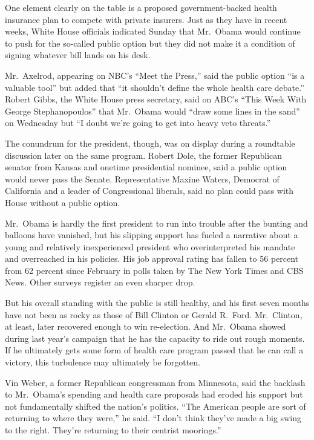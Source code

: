 ﻿\documentclass[12pt]{article}
\begin{document}
One element clearly on the table is a proposed government-backed health insurance plan to compete
with private insurers. Just as they have in recent weeks, White House officials indicated Sunday
that Mr.~Obama would continue to push for the so-called public option but they did not make it a
condition of signing whatever bill lands on his desk.

Mr.~Axelrod, appearing on NBC's ``Meet the Press,'' said the public option ``is a valuable tool''
but added that ``it shouldn't define the whole health care debate.'' Robert Gibbs, the White House
press secretary, said on ABC's ``This Week With George Stephanopoulos'' that Mr.~Obama would ``draw
some lines in the sand'' on Wednesday but ``I doubt we're going to get into heavy veto threats.''

The conundrum for the president, though, was on display during a roundtable discussion later on the
same program. Robert Dole, the former Republican senator from Kansas and onetime presidential
nominee, said a public option would never pass the Senate. Representative Maxine Waters, Democrat of
California and a leader of Congressional liberals, said no plan could pass with House without a
public option.

Mr.~Obama is hardly the first president to run into trouble after the bunting and balloons have
vanished, but his slipping support has fueled a narrative about a young and relatively inexperienced
president who overinterpreted his mandate and overreached in his policies. His job approval rating
has fallen to 56 percent from 62 percent since February in polls taken by The New York Times and CBS
News. Other surveys register an even sharper drop.

But his overall standing with the public is still healthy, and his first seven months have not been
as rocky as those of Bill Clinton or Gerald R.~Ford. Mr.~Clinton, at least, later recovered enough
to win re-election. And Mr.~Obama showed during last year's campaign that he has the capacity to
ride out rough moments. If he ultimately gets some form of health care program passed that he can
call a victory, this turbulence may ultimately be forgotten.

Vin Weber, a former Republican congressman from Minnesota, said the backlash to Mr.~Obama's spending
and health care proposals had eroded his support but not fundamentally shifted the nation's
politics. ``The American people are sort of returning to where they were,'' he said. ``I don't think
they've made a big swing to the right. They're returning to their centrist moorings.''
\end{document}
